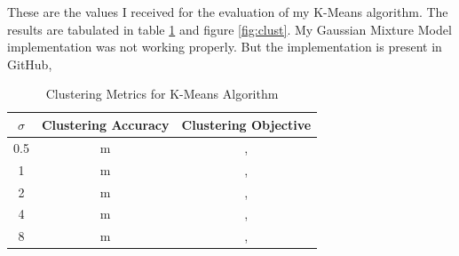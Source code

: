 \documentclass[a4paper]{article}
\newcounter{thm}
\theoremstyle{definition}
\newenvironment{soln}{
    \leavevmode\color{blue}\ignorespaces
}{}
\begin{document}
\begin{soln}
    These are the values I received for the evaluation of my K-Means algorithm. The results are tabulated in table \ref{tab:clust} and figure \ref{fig:clust}. My Gaussian Mixture Model implementation was not working properly. But the implementation is present in GitHub,

    \begin{table}[h]
        \centering
        \begin{tabular}{|c|c|c|}
            \hline
            $\sigma$ & \textbf{Clustering Accuracy} & \textbf{Clustering Objective} \\
            \hline
            0.5 & m & , \\
            \hline
            1 & m & , \\
            \hline
            2 & m & , \\
            \hline
            4 & m & , \\
            \hline
            8 & m & , \\
            \hline
        \end{tabular}
        \caption{Clustering Metrics for K-Means Algorithm}
        \label{tab:clust}
    \end{table}


\end{soln}
\end{document}
